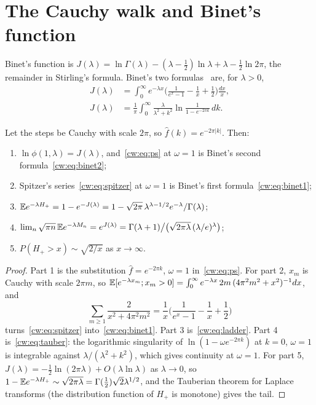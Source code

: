 \section{The Cauchy walk and Binet's function}\label{cw:sec:cauchy}

Binet's function is $J(\lambda)=\ln\Gamma(\lambda)-(\lambda-\tfrac12)\ln\lambda+\lambda-\tfrac12\ln2\pi$, the remainder in Stirling's formula. Binet's two formulas~\cite[\S5.9]{DLMF} are, for $\lambda>0$,
\begin{align}
J(\lambda)&=\int_0^\infty e^{-\lambda x}\Big(\frac1{e^x-1}-\frac1x+\frac12\Big)\frac{dx}{x},\label{cw:eq:binet1}\\
J(\lambda)&=\frac1\pi\int_0^\infty\frac{\lambda}{\lambda^2+k^2}\ln\frac{1}{1-e^{-2\pi k}}\,dk.\label{cw:eq:binet2}
\end{align}

\begin{theorem}[proved]\label{cw:thm:cauchy}
Let the steps be Cauchy with scale $2\pi$, so $\hat f(k)=e^{-2\pi|k|}$. Then:
\begin{enumerate}
\item $\ln\phi(1,\lambda)=J(\lambda)$, and~\eqref{cw:eq:ps} at $\omega=1$ is Binet's second formula~\eqref{cw:eq:binet2};
\item Spitzer's series~\eqref{cw:eq:spitzer} at $\omega=1$ is Binet's first formula~\eqref{cw:eq:binet1};
\item $\mathbb{E} e^{-\lambda H_+}=1-e^{-J(\lambda)}=1-\sqrt{2\pi}\,\lambda^{\lambda-1/2}e^{-\lambda}/\Gamma(\lambda)$;
\item $\lim_n\sqrt{\pi n}\,\mathbb{E} e^{-\lambda M_n}=e^{J(\lambda)}=\Gamma(\lambda+1)\big/\big(\sqrt{2\pi\lambda}\,(\lambda/e)^\lambda\big)$;
\item $P(H_+>x)\sim\sqrt{2/x}$ as $x\to\infty$.
\end{enumerate}
\end{theorem}

\begin{proof}
Part 1 is the substitution $\hat f=e^{-2\pi k}$, $\omega=1$ in~\eqref{cw:eq:ps}. For part 2, $x_m$ is Cauchy with scale $2\pi m$, so $\mathbb{E}[e^{-\lambda x_m};x_m>0]=\int_0^\infty e^{-\lambda x}\,2m\,(4\pi^2m^2+x^2)^{-1}dx$, and
\[
\sum_{m\ge1}\frac{2}{x^2+4\pi^2m^2}=\frac1x\Big(\frac1{e^x-1}-\frac1x+\frac12\Big)
\]
turns~\eqref{cw:eq:spitzer} into~\eqref{cw:eq:binet1}. Part 3 is~\eqref{cw:eq:ladder}. Part 4 is~\eqref{cw:eq:tauber}: the logarithmic singularity of $\ln(1-\omega e^{-2\pi k})$ at $k=0$, $\omega=1$ is integrable against $\lambda/(\lambda^2+k^2)$, which gives continuity at $\omega=1$. For part 5, $J(\lambda)=-\tfrac12\ln(2\pi\lambda)+O(\lambda\ln\lambda)$ as $\lambda\to0$, so $1-\mathbb{E} e^{-\lambda H_+}\sim\sqrt{2\pi\lambda}=\Gamma(\tfrac12)\sqrt2\lambda^{1/2}$, and the Tauberian theorem for Laplace transforms (the distribution function of $H_+$ is monotone) gives the tail.
\end{proof}

